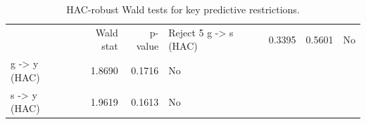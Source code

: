 \begin{table}[H]
\centering
\caption{HAC-robust Wald tests for key predictive restrictions.}
\label{tab:granger_hac}
\begin{tabular}{lrrl}
\toprule
 & Wald stat & p-value & Reject 5%
\midrule
g -> s (HAC) & 0.3395 & 0.5601 & No \\
g -> y (HAC) & 1.8690 & 0.1716 & No \\
s -> y (HAC) & 1.9619 & 0.1613 & No \\
\bottomrule
\end{tabular}
\end{table}